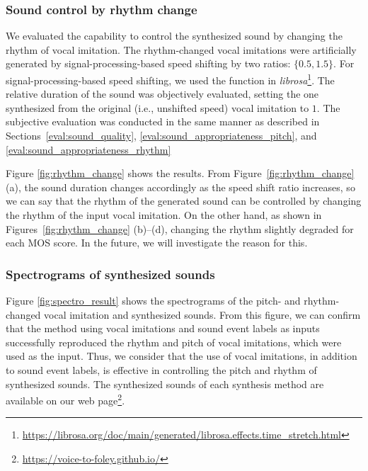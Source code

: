 \documentclass{article}
\begin{document}
\vspace{-3pt}
\subsubsection{Sound control by rhythm change}
\vspace{-3pt}
\label{eval:time_shift}
We evaluated the capability to control the synthesized sound by changing the rhythm of vocal imitation.
The rhythm-changed vocal imitations were artificially generated by signal-processing-based speed shifting by two ratios: $\{0.5, 1.5\}$.
For signal-processing-based speed shifting, we used the function in {\it librosa}\footnote{\scriptsize{\url{https://librosa.org/doc/main/generated/librosa.effects.time_stretch.html}}}.
The relative duration of the sound was objectively evaluated, setting the one synthesized from the original (i.e., unshifted speed) vocal imitation to $1$.
The subjective evaluation was conducted in the same manner as described in Sections~\ref{eval:sound_quality}, \ref{eval:sound_appropriateness_pitch}, and \ref{eval:sound_appropriateness_rhythm}

Figure \ref{fig:rhythm_change} shows the results.
From Figure~\ref{fig:rhythm_change} (a), the sound duration changes accordingly as the speed shift ratio increases, so we can say that the rhythm of the generated sound can be controlled by changing the rhythm of the input vocal imitation.
On the other hand, as shown in Figures~\ref{fig:rhythm_change} (b)--(d), changing the rhythm slightly degraded for each MOS score.
In the future,  we will investigate the reason for this.

\vspace{-3pt}
\subsubsection{Spectrograms of synthesized sounds}
\vspace{-3pt}
\label{eval:spectro}
Figure \ref{fig:spectro_result} shows the spectrograms of the pitch- and rhythm-changed vocal imitation and synthesized sounds.
From this figure, we can confirm that the method using vocal imitations and sound event labels as inputs successfully reproduced the rhythm and pitch of vocal imitations, which were used as the input.
Thus, we consider that the use of vocal imitations, in addition to sound event labels, is effective in controlling the pitch and rhythm of synthesized sounds.
The synthesized sounds of each synthesis method are available on our web page\footnote{\scriptsize{\url{https://voice-to-foley.github.io/}}}.
\end{document}
